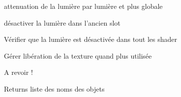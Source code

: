 
\begin{DoxyRefList}
\item[\label{todo__todo000001}%
\hypertarget{todo__todo000001}{}%
Class \hyperlink{class_light}{Light} ]attenuation de la lumière par lumière et plus globale  
\item[\label{todo__todo000003}%
\hypertarget{todo__todo000003}{}%
Member \hyperlink{class_light_a985e67a0b88ba49ec8da5d5b205d06ed}{Light\+:\+:set\+Number} (char num)]désactiver la lumière dans l'ancien slot  
\item[\label{todo__todo000002}%
\hypertarget{todo__todo000002}{}%
Member \hyperlink{class_light_ad0e59fad13bb6cfadc25b2c477e9ddc7}{Light\+:\+:$\sim$\+Light} ()]Vérifier que la lumière est désactivée dans tout les shader  
\item[\label{todo__todo000004}%
\hypertarget{todo__todo000004}{}%
Member \hyperlink{class_material_a2c19452d71f54075df8f5405b03129f4}{Material\+:\+:$\sim$\+Material} ()]Gérer libération de la texture quand plus utilisée  
\item[\label{todo__todo000005}%
\hypertarget{todo__todo000005}{}%
Member \hyperlink{class_piece_a029823aa5135b356a9e4da14578db4e8}{Piece\+:\+:get\+Children} () const ]A revoir ! \begin{DoxyReturn}{Returns}
liste des noms des objets 
\end{DoxyReturn}

\end{DoxyRefList}